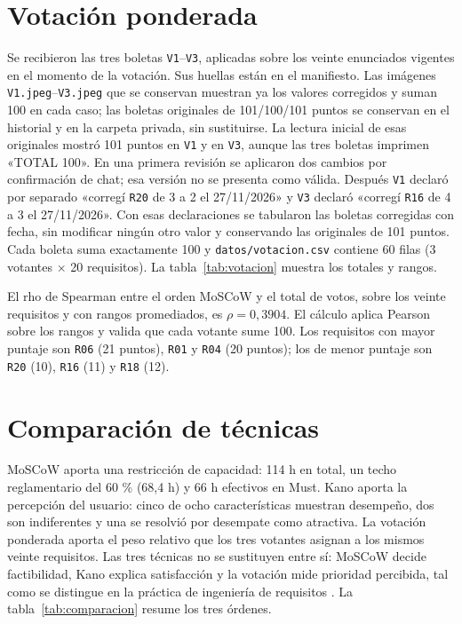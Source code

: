 \documentclass[11pt,a4paper]{article}
\begin{document}
\section{Votación ponderada}
Se recibieron las tres boletas \texttt{V1}--\texttt{V3}, aplicadas sobre los veinte enunciados vigentes en el momento de la votación. Sus huellas están en el manifiesto. Las imágenes \texttt{V1.jpeg}--\texttt{V3.jpeg} que se conservan muestran ya los valores corregidos y suman 100 en cada caso; las boletas originales de 101/100/101 puntos se conservan en el historial y en la carpeta privada, sin sustituirse. La lectura inicial de esas originales mostró 101 puntos en \texttt{V1} y en \texttt{V3}, aunque las tres boletas imprimen «TOTAL 100». En una primera revisión se aplicaron dos cambios por confirmación de chat; esa versión no se presenta como válida. Después \texttt{V1} declaró por separado «corregí \texttt{R20} de 3 a 2 el 27/11/2026» y \texttt{V3} declaró «corregí \texttt{R16} de 4 a 3 el 27/11/2026». Con esas declaraciones se tabularon las boletas corregidas con fecha, sin modificar ningún otro valor y conservando las originales de 101 puntos. Cada boleta suma exactamente 100 y \texttt{datos/votacion.csv} contiene 60 filas (3 votantes $\times$ 20 requisitos). La tabla~\ref{tab:votacion} muestra los totales y rangos.



El rho de Spearman entre el orden MoSCoW y el total de votos, sobre los veinte requisitos y con rangos promediados, es $\rho = 0{,}3904$. El cálculo aplica Pearson sobre los rangos y valida que cada votante sume 100. Los requisitos con mayor puntaje son \texttt{R06} (21 puntos), \texttt{R01} y \texttt{R04} (20 puntos); los de menor puntaje son \texttt{R20} (10), \texttt{R16} (11) y \texttt{R18} (12).

\section{Comparación de técnicas}
MoSCoW aporta una restricción de capacidad: 114 h en total, un techo reglamentario del 60 \% (68,4 h) y 66 h efectivos en Must. Kano aporta la percepción del usuario: cinco de ocho características muestran desempeño, dos son indiferentes y una se resolvió por desempate como atractiva. La votación ponderada aporta el peso relativo que los tres votantes asignan a los mismos veinte requisitos. Las tres técnicas no se sustituyen entre sí: MoSCoW decide factibilidad, Kano explica satisfacción y la votación mide prioridad percibida, tal como se distingue en la práctica de ingeniería de requisitos \cite{ireb2026}. La tabla~\ref{tab:comparacion} resume los tres órdenes.
\end{document}
